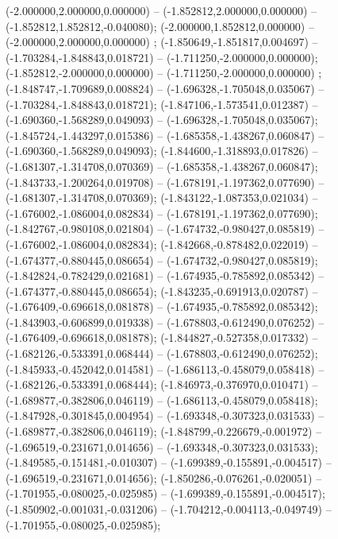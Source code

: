  (-2.000000,2.000000,0.000000) -- (-1.852812,2.000000,0.000000) -- (-1.852812,1.852812,-0.040080);
 (-2.000000,1.852812,0.000000) -- (-2.000000,2.000000,0.000000) ;
 (-1.850649,-1.851817,0.004697) -- (-1.703284,-1.848843,0.018721) -- (-1.711250,-2.000000,0.000000);
 (-1.852812,-2.000000,0.000000) -- (-1.711250,-2.000000,0.000000) ;
 (-1.848747,-1.709689,0.008824) -- (-1.696328,-1.705048,0.035067) -- (-1.703284,-1.848843,0.018721);
 (-1.847106,-1.573541,0.012387) -- (-1.690360,-1.568289,0.049093) -- (-1.696328,-1.705048,0.035067);
 (-1.845724,-1.443297,0.015386) -- (-1.685358,-1.438267,0.060847) -- (-1.690360,-1.568289,0.049093);
 (-1.844600,-1.318893,0.017826) -- (-1.681307,-1.314708,0.070369) -- (-1.685358,-1.438267,0.060847);
 (-1.843733,-1.200264,0.019708) -- (-1.678191,-1.197362,0.077690) -- (-1.681307,-1.314708,0.070369);
 (-1.843122,-1.087353,0.021034) -- (-1.676002,-1.086004,0.082834) -- (-1.678191,-1.197362,0.077690);
 (-1.842767,-0.980108,0.021804) -- (-1.674732,-0.980427,0.085819) -- (-1.676002,-1.086004,0.082834);
 (-1.842668,-0.878482,0.022019) -- (-1.674377,-0.880445,0.086654) -- (-1.674732,-0.980427,0.085819);
 (-1.842824,-0.782429,0.021681) -- (-1.674935,-0.785892,0.085342) -- (-1.674377,-0.880445,0.086654);
 (-1.843235,-0.691913,0.020787) -- (-1.676409,-0.696618,0.081878) -- (-1.674935,-0.785892,0.085342);
 (-1.843903,-0.606899,0.019338) -- (-1.678803,-0.612490,0.076252) -- (-1.676409,-0.696618,0.081878);
 (-1.844827,-0.527358,0.017332) -- (-1.682126,-0.533391,0.068444) -- (-1.678803,-0.612490,0.076252);
 (-1.845933,-0.452042,0.014581) -- (-1.686113,-0.458079,0.058418) -- (-1.682126,-0.533391,0.068444);
 (-1.846973,-0.376970,0.010471) -- (-1.689877,-0.382806,0.046119) -- (-1.686113,-0.458079,0.058418);
 (-1.847928,-0.301845,0.004954) -- (-1.693348,-0.307323,0.031533) -- (-1.689877,-0.382806,0.046119);
 (-1.848799,-0.226679,-0.001972) -- (-1.696519,-0.231671,0.014656) -- (-1.693348,-0.307323,0.031533);
 (-1.849585,-0.151481,-0.010307) -- (-1.699389,-0.155891,-0.004517) -- (-1.696519,-0.231671,0.014656);
 (-1.850286,-0.076261,-0.020051) -- (-1.701955,-0.080025,-0.025985) -- (-1.699389,-0.155891,-0.004517);
 (-1.850902,-0.001031,-0.031206) -- (-1.704212,-0.004113,-0.049749) -- (-1.701955,-0.080025,-0.025985);
